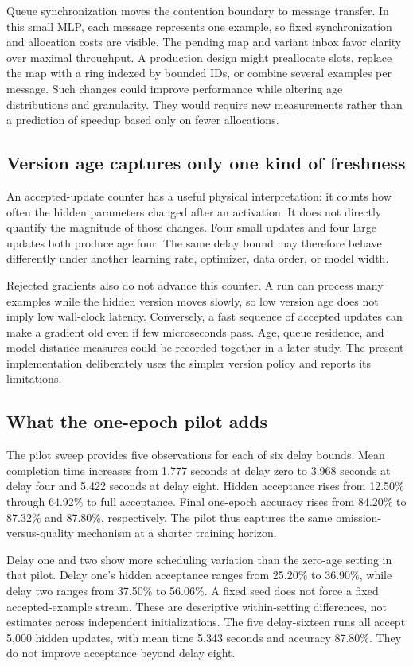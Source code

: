 \documentclass[conference]{IEEEtran}
\begin{document}
Queue synchronization moves the contention boundary to message transfer. In this small MLP, each message represents one example, so fixed synchronization and allocation costs are visible. The pending map and variant inbox favor clarity over maximal throughput. A production design might preallocate slots, replace the map with a ring indexed by bounded IDs, or combine several examples per message. Such changes could improve performance while altering age distributions and granularity. They would require new measurements rather than a prediction of speedup based only on fewer allocations.

\subsection{Version age captures only one kind of freshness}
An accepted-update counter has a useful physical interpretation: it counts how often the hidden parameters changed after an activation. It does not directly quantify the magnitude of those changes. Four small updates and four large updates both produce age four. The same delay bound may therefore behave differently under another learning rate, optimizer, data order, or model width.

Rejected gradients also do not advance this counter. A run can process many examples while the hidden version moves slowly, so low version age does not imply low wall-clock latency. Conversely, a fast sequence of accepted updates can make a gradient old even if few microseconds pass. Age, queue residence, and model-distance measures could be recorded together in a later study. The present implementation deliberately uses the simpler version policy and reports its limitations.

\subsection{What the one-epoch pilot adds}
The pilot sweep provides five observations for each of six delay bounds. Mean completion time increases from 1.777 seconds at delay zero to 3.968 seconds at delay four and 5.422 seconds at delay eight. Hidden acceptance rises from 12.50\% through 64.92\% to full acceptance. Final one-epoch accuracy rises from 84.20\% to 87.32\% and 87.80\%, respectively. The pilot thus captures the same omission-versus-quality mechanism at a shorter training horizon.

Delay one and two show more scheduling variation than the zero-age setting in that pilot. Delay one's hidden acceptance ranges from 25.20\% to 36.90\%, while delay two ranges from 37.50\% to 56.06\%. A fixed seed does not force a fixed accepted-example stream. These are descriptive within-setting differences, not estimates across independent initializations. The five delay-sixteen runs all accept 5,000 hidden updates, with mean time 5.343 seconds and accuracy 87.80\%. They do not improve acceptance beyond delay eight.
\end{document}
